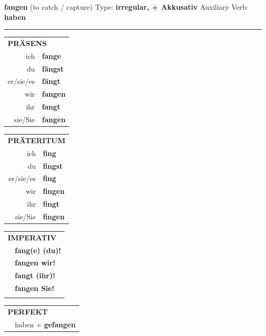 \documentclass[10pt,a4paper]{revtex4-2}
\begin{document}
\begin{verbbox-acc}
    {\Large \bf fangen} (to catch / capture) \hfill Type: \textbf{irregular, + Akkusativ} \hfill Auxiliary Verb: \textbf{haben} 
    
     \vspace{5pt}

    \hrule
    
    \vspace{5pt}

  \begin{tabular}{rl}
     \multicolumn{2}{l}{\textbf{PRÄSENS} }\\
    ich & \textbf{fange}\\
    du & \textbf{fängst}\\
    er/sie/es & \textbf{fängt}\\
    wir & \textbf{fangen}\\
    ihr & \textbf{fangt}\\
    sie/Sie & \textbf{fangen}\\
  \end{tabular}
  \hfill
     \begin{tabular}{rl}
    \multicolumn{2}{l}{\textbf{PRÄTERITUM} }\\
    ich & \textbf{fing}\\
    du & \textbf{fingst}\\
    er/sie/es & \textbf{fing}\\
    wir & \textbf{fingen}\\
    ihr & \textbf{fingt}\\
    sie/Sie & \textbf{fingen}\\
  \end{tabular}
  \hfill
  \begin{tabular}{rl}
     \multicolumn{2}{l}{\textbf{IMPERATIV} }\\
   & \textbf{fang(e) (du)!}\\
   & \textbf{fangen wir!}\\
   & \textbf{fangt (ihr)!}\\
   & \textbf{fangen Sie!}\\
   & \vspace{10pt}
  \end{tabular}

    \vspace{10pt}

 \begin{tabular}{rl}
     \multicolumn{2}{l}{\textbf{PERFEKT}}\\
  &  haben + \textbf{gefangen}\\
  \end{tabular}
\hfill
   \begin{tabular}{rl}
   

\end{tabular}
\end{verbbox-acc}
\end{document}
